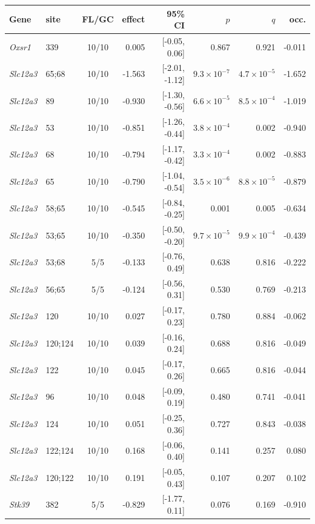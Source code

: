 \documentclass[11pt]{article}
\begin{document}
\begin{table}[htbp]
\centering
\small
\begin{tabular}{llcrrrrr}
\toprule
Gene & site & FL/GC & effect & 95\% CI & $p$ & $q$ & occ. \\
\midrule
\textit{Oxsr1} & 339 & 10/10 & 0.005 & [-0.05, 0.06] & 0.867 & 0.921 & -0.011 \\
\textit{Slc12a3} & 65;68 & 10/10 & -1.563 & [-2.01, -1.12] & $9.3\times10^{-7}$ & $4.7\times10^{-5}$ & -1.652 \\
\textit{Slc12a3} & 89 & 10/10 & -0.930 & [-1.30, -0.56] & $6.6\times10^{-5}$ & $8.5\times10^{-4}$ & -1.019 \\
\textit{Slc12a3} & 53 & 10/10 & -0.851 & [-1.26, -0.44] & $3.8\times10^{-4}$ & 0.002 & -0.940 \\
\textit{Slc12a3} & 68 & 10/10 & -0.794 & [-1.17, -0.42] & $3.3\times10^{-4}$ & 0.002 & -0.883 \\
\textit{Slc12a3} & 65 & 10/10 & -0.790 & [-1.04, -0.54] & $3.5\times10^{-6}$ & $8.8\times10^{-5}$ & -0.879 \\
\textit{Slc12a3} & 58;65 & 10/10 & -0.545 & [-0.84, -0.25] & 0.001 & 0.005 & -0.634 \\
\textit{Slc12a3} & 53;65 & 10/10 & -0.350 & [-0.50, -0.20] & $9.7\times10^{-5}$ & $9.9\times10^{-4}$ & -0.439 \\
\textit{Slc12a3} & 53;68 & 5/5 & -0.133 & [-0.76, 0.49] & 0.638 & 0.816 & -0.222 \\
\textit{Slc12a3} & 56;65 & 5/5 & -0.124 & [-0.56, 0.31] & 0.530 & 0.769 & -0.213 \\
\textit{Slc12a3} & 120 & 10/10 & 0.027 & [-0.17, 0.23] & 0.780 & 0.884 & -0.062 \\
\textit{Slc12a3} & 120;124 & 10/10 & 0.039 & [-0.16, 0.24] & 0.688 & 0.816 & -0.049 \\
\textit{Slc12a3} & 122 & 10/10 & 0.045 & [-0.17, 0.26] & 0.665 & 0.816 & -0.044 \\
\textit{Slc12a3} & 96 & 10/10 & 0.048 & [-0.09, 0.19] & 0.480 & 0.741 & -0.041 \\
\textit{Slc12a3} & 124 & 10/10 & 0.051 & [-0.25, 0.36] & 0.727 & 0.843 & -0.038 \\
\textit{Slc12a3} & 122;124 & 10/10 & 0.168 & [-0.06, 0.40] & 0.141 & 0.257 & 0.080 \\
\textit{Slc12a3} & 120;122 & 10/10 & 0.191 & [-0.05, 0.43] & 0.107 & 0.207 & 0.102 \\
\textit{Stk39} & 382 & 5/5 & -0.829 & [-1.77, 0.11] & 0.076 & 0.169 & -0.910 \\

\end{tabular}
\end{table}
\end{document}
